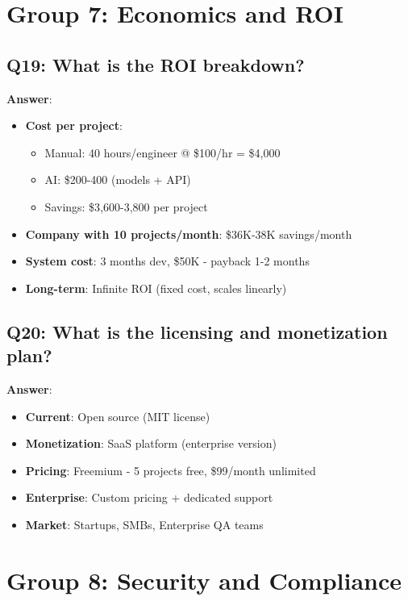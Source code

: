 \documentclass[12pt,a4paper]{report}
\begin{document}
\section{Group 7: Economics and ROI}

\subsection{Q19: What is the ROI breakdown?}

\textbf{Answer}:
\begin{itemize}
    \item \textbf{Cost per project}: 
    \begin{itemize}
        \item Manual: 40 hours/engineer @ \$100/hr = \$4,000
        \item AI: \$200-400 (models + API)
        \item Savings: \$3,600-3,800 per project
    \end{itemize}
    \item \textbf{Company with 10 projects/month}: \$36K-38K savings/month
    \item \textbf{System cost}: 3 months dev, \$50K - payback 1-2 months
    \item \textbf{Long-term}: Infinite ROI (fixed cost, scales linearly)
\end{itemize}

\subsection{Q20: What is the licensing and monetization plan?}

\textbf{Answer}:
\begin{itemize}
    \item \textbf{Current}: Open source (MIT license)
    \item \textbf{Monetization}: SaaS platform (enterprise version)
    \item \textbf{Pricing}: Freemium - 5 projects free, \$99/month unlimited
    \item \textbf{Enterprise}: Custom pricing + dedicated support
    \item \textbf{Market}: Startups, SMBs, Enterprise QA teams
\end{itemize}

\section{Group 8: Security and Compliance}
\end{document}
